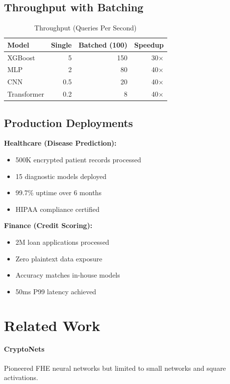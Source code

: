 \documentclass{../shared/luxfhe}
\begin{document}
\subsection{Throughput with Batching}

\begin{table}[h]
\centering
\caption{Throughput (Queries Per Second)}
\begin{tabular}{lrrr}
\toprule
Model & Single & Batched (100) & Speedup \\
\midrule
XGBoost & 5 & 150 & 30$\times$ \\
MLP & 2 & 80 & 40$\times$ \\
CNN & 0.5 & 20 & 40$\times$ \\
Transformer & 0.2 & 8 & 40$\times$ \\
\bottomrule
\end{tabular}
\end{table}

\subsection{Production Deployments}

\textbf{Healthcare (Disease Prediction):}
\begin{itemize}[noitemsep]
    \item 500K encrypted patient records processed
    \item 15 diagnostic models deployed
    \item 99.7\% uptime over 6 months
    \item HIPAA compliance certified
\end{itemize}

\textbf{Finance (Credit Scoring):}
\begin{itemize}[noitemsep]
    \item 2M loan applications processed
    \item Zero plaintext data exposure
    \item Accuracy matches in-house models
    \item 50ms P99 latency achieved
\end{itemize}

\section{Related Work}

\paragraph{CryptoNets~\cite{cryptonets}} Pioneered FHE neural networks but limited to small networks and square activations.
\end{document}
